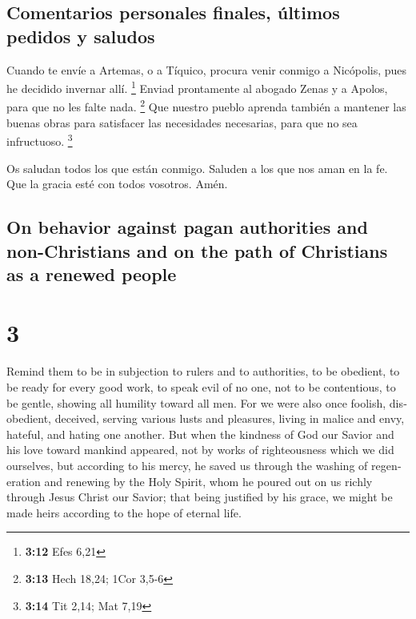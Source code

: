 \begin{paracol}{2}
{\subsection{Comentarios personales finales, últimos pedidos y
saludos}\label{comentarios-personales-finales-uxfaltimos-pedidos-y-saludos}}

 Cuando te envíe a Artemas, o a Tíquico, procura venir
conmigo a Nicópolis, pues he decidido invernar allí. \footnote{\textbf{3:12}
  Efes 6,21}  Enviad prontamente al abogado Zenas y a
Apolos, para que no les falte nada. \footnote{\textbf{3:13} Hech 18,24;
  1Cor 3,5-6}  Que nuestro pueblo aprenda también a
mantener las buenas obras para satisfacer las necesidades necesarias,
para que no sea infructuoso. \footnote{\textbf{3:14} Tit 2,14; Mat 7,19}

 Os saludan todos los que están conmigo. Saluden a los
que nos aman en la fe. Que la gracia esté con todos vosotros. Amén.
\switchcolumn \begin{otherlanguage}{english}

\hypertarget{on-behavior-against-pagan-authorities-and-non-christians-and-on-the-path-of-christians-as-a-renewed-people}{%
\subsection{On behavior against pagan authorities and non-Christians and
on the path of Christians as a renewed
people}\label{on-behavior-against-pagan-authorities-and-non-christians-and-on-the-path-of-christians-as-a-renewed-people}}

\hypertarget{section-5}{%
\section{3}\label{section-5}}

 Remind them to be in subjection to rulers and to
authorities, to be obedient, to be ready for every good work,
 to speak evil of no one, not to be contentious, to be
gentle, showing all humility toward all men.  For we were
also once foolish, disobedient, deceived, serving various lusts and
pleasures, living in malice and envy, hateful, and hating one another.
 But when the kindness of God our Savior and his love
toward mankind appeared,  not by works of righteousness
which we did ourselves, but according to his mercy, he saved us through
the washing of regeneration and renewing by the Holy Spirit,
 whom he poured out on us richly through Jesus Christ our
Savior;  that being justified by his grace, we might be
made heirs according to the hope of eternal life.


\end{otherlanguage}
\end{paracol}
